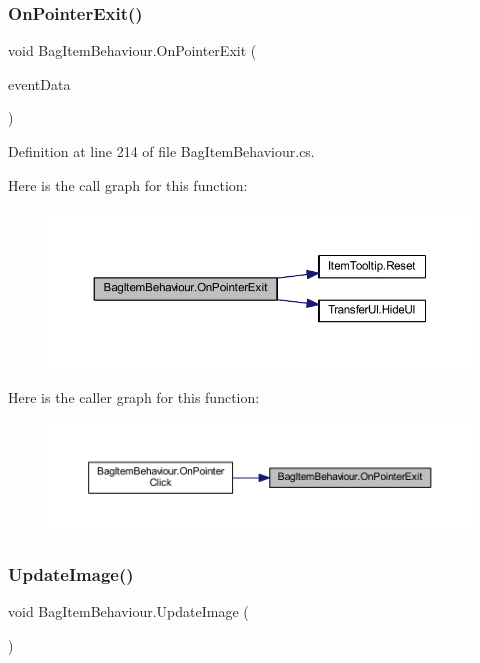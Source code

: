 \subsubsection{\texorpdfstring{OnPointerExit()}{OnPointerExit()}}
{\footnotesize\ttfamily void Bag\+Item\+Behaviour.\+On\+Pointer\+Exit (\begin{DoxyParamCaption}\item[{Pointer\+Event\+Data}]{event\+Data }\end{DoxyParamCaption})}



Definition at line 214 of file Bag\+Item\+Behaviour.\+cs.

Here is the call graph for this function\+:
\nopagebreak
\begin{figure}[H]
\begin{center}
\leavevmode
\includegraphics[width=350pt]{class_bag_item_behaviour_a94a401c7a518b7ed17e5648153d6f1b6_cgraph}
\end{center}
\end{figure}
Here is the caller graph for this function\+:
\nopagebreak
\begin{figure}[H]
\begin{center}
\leavevmode
\includegraphics[width=350pt]{class_bag_item_behaviour_a94a401c7a518b7ed17e5648153d6f1b6_icgraph}
\end{center}
\end{figure}
\mbox{\label{class_bag_item_behaviour_aaedcc49f5d2def63dcde17d72fdb3b9d}} 
\subsubsection{\texorpdfstring{UpdateImage()}{UpdateImage()}}
{\footnotesize\ttfamily void Bag\+Item\+Behaviour.\+Update\+Image (\begin{DoxyParamCaption}{ }\end{DoxyParamCaption})}




